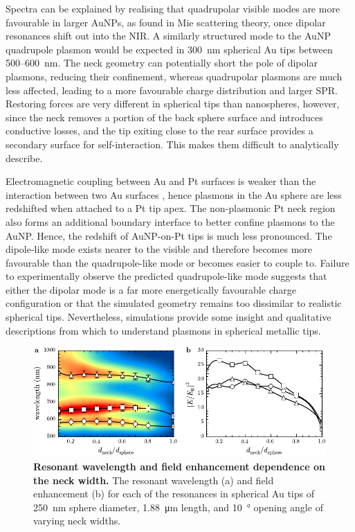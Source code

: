 \documentclass{article}
\begin{document}
Spectra can be explained by realising that quadrupolar visible modes are more favourable in larger AuNPs, as found in Mie scattering theory, once dipolar resonances shift out into the NIR. A similarly structured mode to the AuNP quadrupole plasmon would be expected in \SI{300}{nm} spherical Au tips between 500--\SI{600}{nm}. The neck geometry can potentially short the pole of dipolar plasmons, reducing their confinement, whereas quadrupolar plasmons are much less affected, leading to a more favourable charge distribution and larger SPR. Restoring forces are very different in spherical tips than nanospheres, however, since the neck removes a portion of the back sphere surface and introduces conductive losses, and the tip exiting close to the rear surface provides a secondary surface for self-interaction. This makes them difficult to analytically describe.

Electromagnetic coupling between Au and Pt surfaces is weaker than the interaction between two Au surfaces \cite{ren2004}, hence plasmons in the Au sphere are less redshifted when attached to a Pt tip apex. The non-plasmonic Pt neck region also forms an additional boundary interface to better confine plasmons to the AuNP. Hence, the redshift of AuNP-on-Pt tips is much less pronounced. The dipole-like mode exists nearer to the visible and therefore becomes more favourable than the quadrupole-like mode or becomes easier to couple to. Failure to experimentally observe the predicted quadrupole-like mode suggests that either the dipolar mode is a far more energetically favourable charge configuration or that the simulated geometry remains too dissimilar to realistic spherical tips. Nevertheless, simulations provide some insight and qualitative descriptions from which to understand plasmons in spherical metallic tips.

\begin{figure}[bt]
\centering
\includegraphics{figures/neck_size_dependence}
\caption[Resonant wavelength and field enhancement dependence on the neck width]{\textbf{Resonant wavelength and field enhancement dependence on the neck width.} The resonant wavelength (a) and field enhancement (b) for each of the resonances in spherical Au tips of \SI{250}{nm} sphere diameter, \SI{1.88}{\micro\metre} length, and \SI{10}{\degree} opening angle of varying neck widths.}
\label{fig:neck_size_dependence}
\end{figure}
\end{document}
